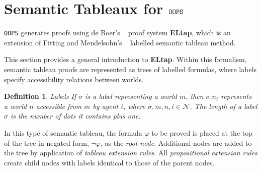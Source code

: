 \documentclass[11pt,a4paper]{article}
\newtheorem{defs}{Definition}[section]
\begin{document}
\section{Semantic Tableaux for $\tt OOPS$}
\label{theory}
{\tt OOPS} generates proofs using de Boer's ~\cite{these} proof system {\bf ELtap}, which is an extension of Fitting and Mendelsohn's ~\cite{fit_men} labelled semantic tableau method.
\par This section provides a general introduction to {\bf ELtap}. Within this formalism, semantic tableau proofs are represented as trees of labelled formulas, where labels specify accessibility relations between worlds.

\begin{defs}{\it Labels} \newline
\label{lab}
If $\sigma$ is a label representing a world $m$, then $\sigma.n_i$ represents a world $n$ accessible from $m$ by agent $i$, where $\sigma,m,n,i \in \mathcal{N}$. The {\it length} of a label $\sigma$ is the number of dots it contains plus one.~\cite{beck_gore} \end{defs} 

In this type of semantic tableau, the formula $\varphi$ to be proved is placed at the top of the tree in negated form, $\neg \varphi$, as the {\it root node}. Additional nodes are added to the tree by application of {\it tableau extension rules}. All {\it propositional extension rules} create child nodes with labels identical to those of the parent nodes.
\end{document}
